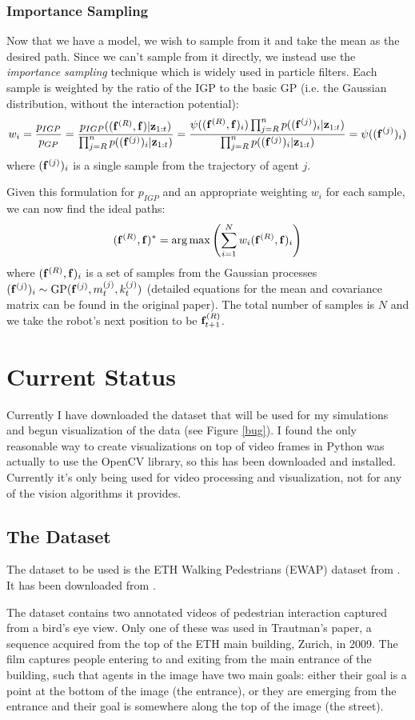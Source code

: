 \documentclass[a4paper,11pt,headings=small]{article}
\DeclareMathOperator*{\argmax}{arg\,max}
\begin{document}
\subsubsection*{Importance Sampling}
\quad Now that we have a model, we wish to sample from it and take the mean as the desired path. Since we can't sample from it directly, we instead use the \emph{importance sampling} technique which is widely used in particle filters. Each sample is weighted by the ratio of the IGP to the basic GP (i.e. the Gaussian distribution, without the interaction potential):
$$ w_i = \frac{p_{IGP}}{p_{GP}} = \frac{p_{IGP}((\mathbf{f}^{(R)},\mathbf{f}) | \mathbf{z}_{1:t})}{\prod_{j=R}^n p((\mathbf{f}^{(j)})_i | \mathbf{z}_{1:t})} = \frac{\psi((\mathbf{f}^{(R)},\mathbf{f})_i) \prod_{j=R}^n p((\mathbf{f}^{(j)})_i | \mathbf{z}_{1:t})}{\prod_{j=R}^n p((\mathbf{f}^{(j)})_i | \mathbf{z}_{1:t})} = \psi((\mathbf{f}^{(j)})_i)$$
where $(\mathbf{f}^{(j)})_i$ is a single sample from the trajectory of agent $j$.

Given this formulation for $p_{IGP}$ and an appropriate weighting $w_i$ for each sample, we can now find the ideal paths:
$$ (\fr,\f)^* = \argmax\left( \sum_{i=1}^N w_i(\fr,\f)_i \right) $$
where $(\mathbf{f}^{(R)},\mathbf{f})_i$ is a set of samples from the Gaussian processes $(\mathbf{f}^{(j)})_i \sim \textrm{GP}(\mathbf{f}^{(j)}, m_t^{(j)}, k_t^{(j)})$ (detailed equations for the mean and covariance matrix can be found in the original paper). The total number of samples is $N$ and we take the robot's next position to be $\mathbf{f}^{(R)}_{t+1}$.

\section*{Current Status}
\quad Currently I have downloaded the dataset that will be used for my simulations and begun visualization of the data (see Figure \ref{bug}). I found the only reasonable way to create visualizations on top of video frames in Python was actually to use the OpenCV library\cite{opencv}, so this has been downloaded and installed. Currently it's only being used for video processing and visualization, not for any of the vision algorithms it provides.

\subsection*{The Dataset}
\quad The dataset to be used is the ETH Walking Pedestrians (EWAP) dataset from \cite{Pellegrini2009}. It has been downloaded from \cite{dataset}.

The dataset contains two annotated videos of pedestrian interaction captured from a bird's eye view. Only one of these was used in Trautman's paper, a sequence acquired from the top of the ETH main building, Zurich, in 2009. The film captures people entering to and exiting from the main entrance of the building, such that agents in the image have two main goals: either their goal is a point at the bottom of the image (the entrance), or they are emerging from the entrance and their goal is somewhere along the top of the image (the street).
\end{document}
